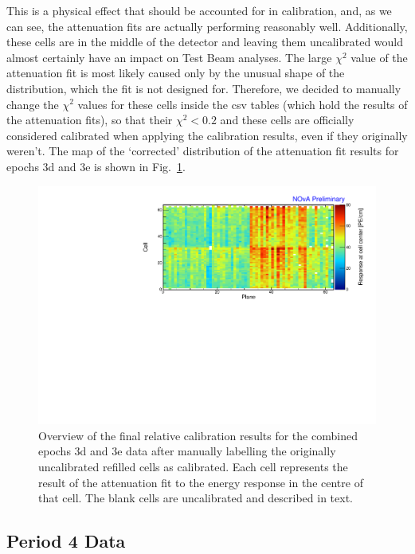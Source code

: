 This is a physical effect that should be accounted for in calibration, and, as we can see, the attenuation fits are actually performing reasonably well. Additionally, these cells are in the middle of the detector and leaving them uncalibrated would almost certainly have an impact on Test Beam analyses. The large $\chi^2$ value of the attenuation fit is most likely caused only by the unusual shape of the distribution, which the fit is not designed for. Therefore, we decided to manually change the $\chi^2$ values for these cells inside the csv tables (which hold the results of the attenuation fits), so that their $\chi^2<0.2$ and these cells are officially considered calibrated when applying the calibration results, even if they originally weren't. The map of the `corrected' distribution of the attenuation fit results for epochs 3d and 3e is shown in Fig.~\ref{fig:CellCentreResponseEp3de_updated}.

\begin{figure}[!hbtp]
\centering
\includegraphics[width=\textwidth]{Plots/TBCalibration/CellResponseAtCentre_epoch3de_Limited_NOvAPlotStyle.pdf}
\caption[Corrected map of fitted response at cell centre for epochs 3d and 3e data]{Overview of the final relative calibration results for the combined epochs 3d and 3e data after manually labelling the originally uncalibrated refilled cells as calibrated. Each cell represents the result of the attenuation fit to the energy response in the centre of that cell. The blank cells are uncalibrated and described in text.}
\label{fig:CellCentreResponseEp3de_updated}
\end{figure}

\subsection{Period 4 Data}\label{sec:TBPeriod4}

